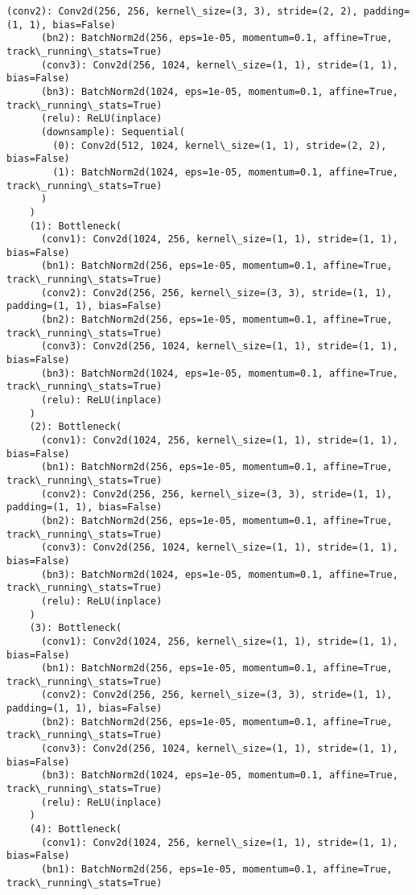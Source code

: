 \documentclass[11pt]{article}
\begin{document}
\begin{Verbatim}[commandchars=\\\{\}]
      (conv2): Conv2d(256, 256, kernel\_size=(3, 3), stride=(2, 2), padding=(1, 1), bias=False)
      (bn2): BatchNorm2d(256, eps=1e-05, momentum=0.1, affine=True, track\_running\_stats=True)
      (conv3): Conv2d(256, 1024, kernel\_size=(1, 1), stride=(1, 1), bias=False)
      (bn3): BatchNorm2d(1024, eps=1e-05, momentum=0.1, affine=True, track\_running\_stats=True)
      (relu): ReLU(inplace)
      (downsample): Sequential(
        (0): Conv2d(512, 1024, kernel\_size=(1, 1), stride=(2, 2), bias=False)
        (1): BatchNorm2d(1024, eps=1e-05, momentum=0.1, affine=True, track\_running\_stats=True)
      )
    )
    (1): Bottleneck(
      (conv1): Conv2d(1024, 256, kernel\_size=(1, 1), stride=(1, 1), bias=False)
      (bn1): BatchNorm2d(256, eps=1e-05, momentum=0.1, affine=True, track\_running\_stats=True)
      (conv2): Conv2d(256, 256, kernel\_size=(3, 3), stride=(1, 1), padding=(1, 1), bias=False)
      (bn2): BatchNorm2d(256, eps=1e-05, momentum=0.1, affine=True, track\_running\_stats=True)
      (conv3): Conv2d(256, 1024, kernel\_size=(1, 1), stride=(1, 1), bias=False)
      (bn3): BatchNorm2d(1024, eps=1e-05, momentum=0.1, affine=True, track\_running\_stats=True)
      (relu): ReLU(inplace)
    )
    (2): Bottleneck(
      (conv1): Conv2d(1024, 256, kernel\_size=(1, 1), stride=(1, 1), bias=False)
      (bn1): BatchNorm2d(256, eps=1e-05, momentum=0.1, affine=True, track\_running\_stats=True)
      (conv2): Conv2d(256, 256, kernel\_size=(3, 3), stride=(1, 1), padding=(1, 1), bias=False)
      (bn2): BatchNorm2d(256, eps=1e-05, momentum=0.1, affine=True, track\_running\_stats=True)
      (conv3): Conv2d(256, 1024, kernel\_size=(1, 1), stride=(1, 1), bias=False)
      (bn3): BatchNorm2d(1024, eps=1e-05, momentum=0.1, affine=True, track\_running\_stats=True)
      (relu): ReLU(inplace)
    )
    (3): Bottleneck(
      (conv1): Conv2d(1024, 256, kernel\_size=(1, 1), stride=(1, 1), bias=False)
      (bn1): BatchNorm2d(256, eps=1e-05, momentum=0.1, affine=True, track\_running\_stats=True)
      (conv2): Conv2d(256, 256, kernel\_size=(3, 3), stride=(1, 1), padding=(1, 1), bias=False)
      (bn2): BatchNorm2d(256, eps=1e-05, momentum=0.1, affine=True, track\_running\_stats=True)
      (conv3): Conv2d(256, 1024, kernel\_size=(1, 1), stride=(1, 1), bias=False)
      (bn3): BatchNorm2d(1024, eps=1e-05, momentum=0.1, affine=True, track\_running\_stats=True)
      (relu): ReLU(inplace)
    )
    (4): Bottleneck(
      (conv1): Conv2d(1024, 256, kernel\_size=(1, 1), stride=(1, 1), bias=False)
      (bn1): BatchNorm2d(256, eps=1e-05, momentum=0.1, affine=True, track\_running\_stats=True)

\end{Verbatim}
\end{document}
